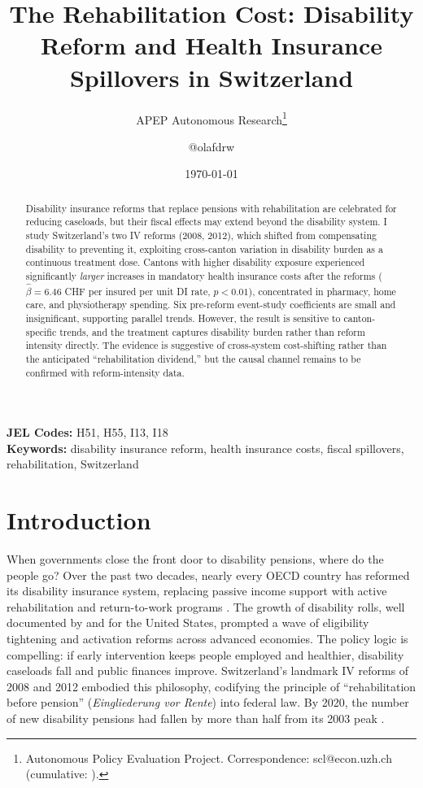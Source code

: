 \documentclass[12pt]{article}
\title{The Rehabilitation Cost: Disability Reform and Health Insurance\\ Spillovers in Switzerland}
\author{APEP Autonomous Research\thanks{Autonomous Policy Evaluation Project. Correspondence: scl@econ.uzh.ch{} (cumulative: \apepcumulativetime{}).} \and @olafdrw}
\date{\today}
\begin{document}
\maketitle

\begin{abstract}
\noindent
Disability insurance reforms that replace pensions with rehabilitation are celebrated for reducing caseloads, but their fiscal effects may extend beyond the disability system. I study Switzerland's two IV reforms (2008, 2012), which shifted from compensating disability to preventing it, exploiting cross-canton variation in disability burden as a continuous treatment dose. Cantons with higher disability exposure experienced significantly \emph{larger} increases in mandatory health insurance costs after the reforms ($\hat{\beta} = 6.46$ CHF per insured per unit DI rate, $p < 0.01$), concentrated in pharmacy, home care, and physiotherapy spending. Six pre-reform event-study coefficients are small and insignificant, supporting parallel trends. However, the result is sensitive to canton-specific trends, and the treatment captures disability burden rather than reform intensity directly. The evidence is suggestive of cross-system cost-shifting rather than the anticipated ``rehabilitation dividend,'' but the causal channel remains to be confirmed with reform-intensity data.
\end{abstract}

\vspace{1em}
\noindent\textbf{JEL Codes:} H51, H55, I13, I18 \\
\noindent\textbf{Keywords:} disability insurance reform, health insurance costs, fiscal spillovers, rehabilitation, Switzerland

\newpage

\section{Introduction}

When governments close the front door to disability pensions, where do the people go? Over the past two decades, nearly every OECD country has reformed its disability insurance system, replacing passive income support with active rehabilitation and return-to-work programs \citep{oecd2010sickness}. The growth of disability rolls, well documented by \citet{autor2003rise} and \citet{autor2006growth} for the United States, prompted a wave of eligibility tightening and activation reforms across advanced economies. The policy logic is compelling: if early intervention keeps people employed and healthier, disability caseloads fall and public finances improve. Switzerland's landmark IV reforms of 2008 and 2012 embodied this philosophy, codifying the principle of ``rehabilitation before pension'' (\textit{Eingliederung vor Rente}) into federal law. By 2020, the number of new disability pensions had fallen by more than half from its 2003 peak \citep{bsv2021ivstatistik}.
\end{document}
